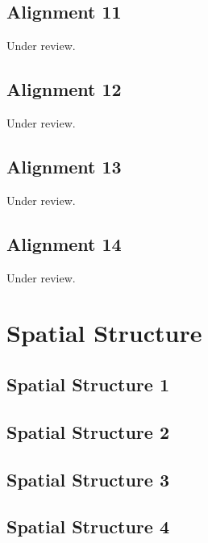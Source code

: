 \documentclass{scrartcl}
\begin{document}
\subsection{Alignment 11}
\label{sec:align_11}
Under review.%
\clearpage

\subsection{Alignment 12}
\label{sec:align_12}
Under review.%
\clearpage

\subsection{Alignment 13}
\label{sec:align_13}
Under review.%
\clearpage

\subsection{Alignment 14}
\label{sec:align_14}
Under review.%
\clearpage

\section{Spatial Structure}

\subsection{Spatial Structure 1}
\label{sec:spatial_1}
\clearpage

\subsection{Spatial Structure 2}
\label{sec:spatial_2}
\clearpage

\subsection{Spatial Structure 3}
\label{sec:spatial_3}
\clearpage

\subsection{Spatial Structure 4}
\label{sec:spatial_4}
\clearpage
\end{document}
